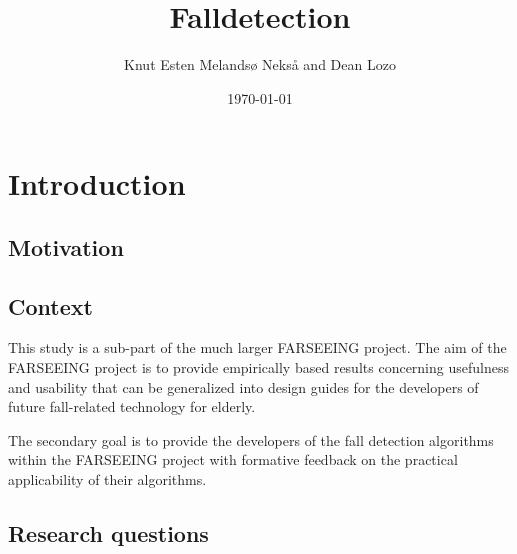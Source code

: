 \documentclass[11pt,twoside,a4paper]{report}
\begin{document}
\title{Falldetection}
\author{Knut Esten Melandsø Nekså and Dean Lozo}
\date{\today}
\maketitle


\begin{abstract}

\end{abstract}

\tableofcontents

\chapter{Introduction}

\section{Motivation}


\section{Context}
This study is a sub-part of the much larger FARSEEING project. The aim of the FARSEEING project is to provide empirically based results concerning usefulness and usability that can be generalized into design guides for the developers of future fall-related technology for elderly.\cite{FARSEEING} %

The secondary goal is to provide the developers of the fall detection algorithms within the FARSEEING project with formative feedback on the practical applicability of their algorithms.\cite{FARSEEING} %


\section{Research questions}
\end{document}

